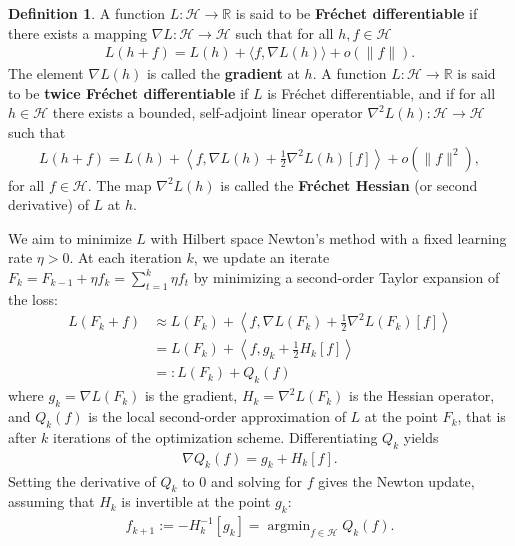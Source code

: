 \documentclass{article}
\theoremstyle{plain}
\theoremstyle{definition}
\newtheorem{definition}[theorem]{Definition}
\theoremstyle{remark}
\newcommand{\bbR}{\mathbb{R}}
\DeclareMathOperator*{\argmin}{argmin}
\begin{document}
\begin{definition}
    A function $L : \mathcal{H} \to \bbR$ is said to be \textbf{Fréchet differentiable} if there exists a mapping $\nabla L : \mathcal{H} \to \mathcal{H}$ such that for all $h,f \in \mathcal{H}$
    \begin{align*}
        L(h + f) = L(h) + \langle f, \nabla L (h)\rangle + o(\|f\|).
    \end{align*}
    The element $\nabla L(h)$ is called the \textbf{gradient} at $h$. A function $L : \mathcal{H} \to \bbR$ is said to be \textbf{twice Fréchet differentiable} if $L$ is Fréchet differentiable, and if for all $h\in\mathcal{H}$ there exists a bounded, self-adjoint linear operator $\nabla^2 L(h) : \mathcal{H} \to \mathcal{H}$ such that
    \begin{align*}
    L(h + f) = L(h) + \left\langle f, \nabla L(h) + \frac{1}{2}  \nabla^2 L(h)[f]
   \right\rangle + o(\|f\|^2),
    \end{align*}
    for all $f \in \mathcal{H}$. The map $\nabla^2 L(h)$ is called the \textbf{Fréchet Hessian} (or second derivative) of $L$ at $h$.
\end{definition}

We aim to minimize $L$ with Hilbert space Newton's method with a fixed learning rate $\eta>0$. At each iteration $k$, we update an iterate $F_k = F_{k-1} + \eta f_k = \sum_{t=1}^k \eta f_t$ by minimizing a second-order Taylor expansion of the loss:
\begin{align*}
    L(F_k + f) &\approx L(F_k) + \left\langle f, \nabla L(F_k) + \frac{1}{2}\nabla^2 L(F_k)[f]  \right\rangle \\
    &=  L(F_k) + \left\langle f,g_k + \frac{1}{2}H_k[f]  \right\rangle \\
    &=: L(F_k) + Q_k(f)
\end{align*}
where $g_k = \nabla L(F_k)$ is the gradient, $H_k = \nabla^2 L(F_k)$ is the Hessian operator, and $Q_k(f)$ is the local second-order approximation of $L$ at the point $F_k$, that is after $k$ iter\-ations of the optimization scheme. Differentiating $Q_k$ yields
\begin{align*}
    \nabla Q_k(f) = g_k + H_k[f].
\end{align*}
Setting the derivative of $Q_k$ to 0 and solving for $f$ gives the Newton update, assuming that $H_k$ is invertible at the point $g_k$:
\begin{align}\label{eqExactNewtonUpdate}
    f_{k+1}  := - H_k^{-1}[g_k] = \argmin_{f \in \mathcal{H}} Q_k(f).
\end{align}
\end{document}
